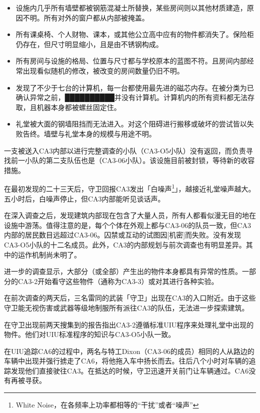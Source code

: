 \begin{itemize}
\item 设施内几乎所有墙壁都被钢筋混凝土所替换，某些房间则以其他材质建造，原因不明。所有对外的窗户都从内部被掩盖。
\item 所有课桌椅、个人财物、课本，或其他公立高中应有的物件都消失了。保险柜仍存在，但尺寸明显缩小，且是由不锈钢构成。
\item 所有房间与设施的格局、位置与尺寸都与学校原本的蓝图不符。且房间内部经常出现看似随机的修改，被改变的房间数量仍旧不明。
\item 发现了不少于七台的计算机，每一台都使用最先进的磁芯内存。在被分类为已确认异常之前，██████████并没有计算机。计算机内的所有资料都无法存取，且机器本身都被螺丝固定住。
\item 礼堂被大面的钢墙阻挡而无法进入。对这个阻碍进行搬移或破坏的尝试皆以失败告终。墙壁与礼堂本身的规模与用途不明。
\end{itemize}

一支被送入CA3内部以进行完整调查的小队（CA3-O5小队）没有返回，而负责寻找前一小队的第二支队伍也是（CA3-06小队）。该设施目前被封锁，等待新的收容措施。

在最初发现的二十三天后，守卫回报CA3发出「白噪声\footnote{White Noise，在各频率上功率都相等的“干扰”或者“噪声”}」，越接近礼堂噪声越大。五小时后，白噪声停止，但CA3内部能听见谈话声。

在深入调查之后，发现建筑内部现在包含了大量人员，所有人都看似漫无目的地在设施中游荡。值得注意的是，每个个体在外观上都与CA3-06的队员一致，但CA3内部的居民数目远超过CA3-06。囚禁或互动的试图因{[}机密]而失败。没有发现CA3-O5小队的十二名成员。此外，CA3的内部规划与前次调查也有明显差异。其中的运作机制尚未明了。

进一步的调查显示，大部分（或全部）产生出的物件本身都具有异常的性质。一部分的CA3-2开始看守这些物件（通称为CA3-3）或对其进行各种实验。

在前次调查的两天后，三名雷同的武装「守卫」出现在CA3的入口附近。由于这些守卫能无视伤害或武器等级地制服所有派往CA3的队伍，无法进一步探索建筑。

在守卫出现前两天搜集到的报告指出CA3-2遵循标准UIU程序来处理礼堂中出现的物件。他们对UIU标准程序的知识与CA3-O5小队一致。

在UIU追踪CA6的过程中，两名与特工Dixon（CA3-06的成员）相同的人从路边的车辆中出现并强行掳走了CA6，将他拖入车中扬长而去。往后八个小时对车辆的追踪发现他们直接驶往CA3。在抵达的时候，守卫迅速开关前门让车辆通过。CA6没有再被寻获。

\hr

